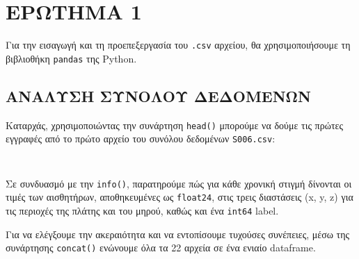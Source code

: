 \chapter{ΕΡΩΤΗΜΑ 1}
    Για την εισαγωγή και τη προεπεξεργασία του \texttt{.csv} αρχείου, θα χρησιμοποιήσουμε τη βιβλιοθήκη \texttt{pandas} της Python.

    \section{ΑΝΑΛΥΣΗ ΣΥΝΟΛΟΥ ΔΕΔΟΜΕΝΩΝ}
        Καταρχάς, χρησιμοποιώντας την συνάρτηση \texttt{head()} μπορούμε να δούμε τις πρώτες εγγραφές από το πρώτο αρχείο του συνόλου δεδομένων \texttt{S006.csv}:

        \begin{table}[ht] \noindent\centering\tt
        \end{table}

        Σε συνδυασμό με την \texttt{info()}, παρατηρούμε πώς για κάθε χρονική στιγμή δίνονται οι τιμές των αισθητήρων, αποθηκευμένες ως \texttt{float24},
        στις τρεις διαστάσεις (x, y, z) για τις περιοχές της πλάτης και του μηρού, καθώς και ένα \texttt{int64} label.

        Για να ελέγξουμε την ακεραιότητα και να εντοπίσουμε τυχούσες συνέπειες, μέσω της συνάρτησης \texttt{concat()} ενώνουμε όλα τα 22 αρχεία σε ένα ενιαίο dataframe.

